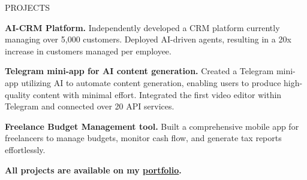 \documentclass{resume} %
\begin{document}
\begin{rSection}{PROJECTS}
\vspace{-1.25em}
\item \textbf{AI-CRM Platform.} {Independently developed a CRM platform currently managing over 5,000 customers. Deployed AI-driven agents, resulting in a 20x increase in customers managed per employee.}
\item \textbf{Telegram mini-app for AI content generation.} {Created a Telegram mini-app utilizing AI to automate content generation, enabling users to produce high-quality content with minimal effort. Integrated the first video editor within Telegram and connected over 20 API services.}
\item \textbf{Freelance Budget Management tool.} {Built a comprehensive mobile app for freelancers to manage budgets, monitor cash flow, and generate tax reports effortlessly.}
\item \textbf{All projects are available on my \href{http://portfolio.maverkh.ru}{portfolio}.} {}
\end{rSection} 
\end{document}
